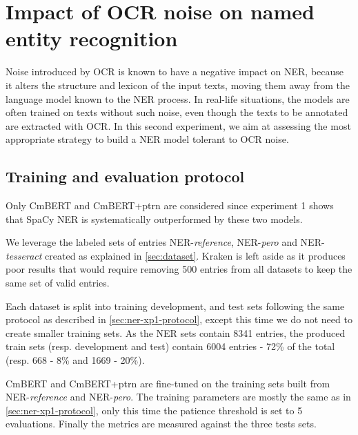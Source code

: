 \section{Impact of OCR noise on named entity recognition}
\label{sec:ner-xp2}
Noise introduced by OCR is known to have a negative impact on NER, because it alters the structure and lexicon of the input texts, moving them away from the language model known to the NER process.
In real-life situations, the models are often trained on texts without such noise, even though the texts to be annotated are extracted with OCR.
In this second experiment, we aim at assessing the most appropriate strategy to build a NER model tolerant to OCR noise.


\subsection{Training and evaluation protocol}
Only CmBERT and CmBERT+ptrn are considered since experiment 1 shows that SpaCy NER is systematically outperformed by these two models.

We leverage the labeled sets of entries NER-\emph{reference}, NER-\emph{pero} and NER-\emph{tesseract} created as explained in \cref{sec:dataset}.
Kraken is left aside as it produces poor results that would require removing 500 entries from all datasets to keep the same set of valid entries.

Each dataset is split into training development, and test sets following the same protocol as described in \cref{sec:ner-xp1-protocol}, except this time we do not need to create smaller training sets.
As the NER sets contain 8341 entries, the produced train sets (resp. development and test) contain 6004 entries - 72\% of the total (resp. 668 - 8\% and 1669 - 20\%).    

CmBERT and CmBERT+ptrn are fine-tuned on the training sets built from NER-\emph{reference} and NER-\emph{pero}.
The training parameters are mostly the same as in \cref{sec:ner-xp1-protocol}, only this time the patience threshold is set to 5 evaluations.
Finally the metrics are measured against the three tests sets.





